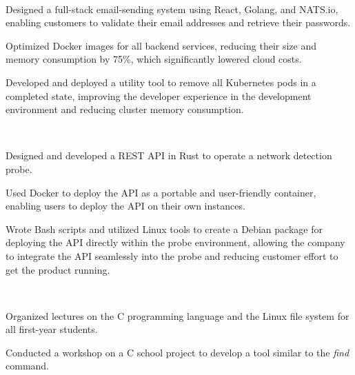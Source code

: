 \documentclass[a4paper]{MagicalCV}
\begin{document}
\begin{minipage}[t]{0.66\textwidth}


 \\
\vspace{\topsep} %
\begin{tightemize}
    \item Designed a full-stack email-sending system using React, Golang, and NATS.io, enabling customers to validate their email addresses and retrieve their passwords.
    \item Optimized Docker images for all backend services, reducing their size and memory consumption by 75\%, which significantly lowered cloud costs.
    \item Developed and deployed a utility tool to remove all Kubernetes pods in a completed state, improving the developer experience in the development environment and reducing cluster memory consumption.
\end{tightemize}
\sectionsep

 \\
\vspace{\topsep} %
\begin{tightemize}
    \item Designed and developed a REST API in Rust to operate a network detection probe.
    \item Used Docker to deploy the API as a portable and user-friendly container, enabling users to deploy the API on their own instances.
    \item Wrote Bash scripts and utilized Linux tools to create a Debian package for deploying the API directly within the probe environment, allowing the company to integrate the API seamlessly into the probe and reducing customer effort to get the product running.
\end{tightemize}
\sectionsep

 \\
\vspace{\topsep} %
\begin{tightemize}
\item Organized lectures on the C programming language and the Linux file system for all first-year students.
\item Conducted a workshop on a C school project to develop a tool similar to the \textit{find} command.
\end{tightemize}
\sectionsep


\end{minipage}
\end{document}
